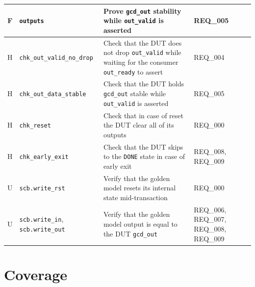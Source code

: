 \begin{table}[H]
\begin{tabularx}{\textwidth}{|c|p{3.9cm}|X|p{1.7cm}|}
        F               & \texttt{outputs}                                                                  & Prove \texttt{gcd\_out} stability while \texttt{out\_valid} is asserted                                                   & REQ\_005                                  \\ \bottomrule \toprule
        H               & \texttt{chk\_out\_valid\_no\_drop}                                                & Check that the DUT does not drop \texttt{out\_valid} while waiting for the consumer \texttt{out\_ready} to assert         & REQ\_004                                  \\ \midrule
        H               & \texttt{chk\_out\_data\_stable}                                                   & Check that the DUT holds \texttt{gcd\_out} stable while \texttt{out\_valid} is asserted                                   & REQ\_005                                  \\ \midrule
        H               & \texttt{chk\_reset}                                                               & Check that in case of reset the DUT clear all of its outputs                                                              & REQ\_000                                  \\ \midrule
        H               & \texttt{chk\_early\_exit}                                                         & Check that the DUT skips to the \texttt{DONE} state in case of early exit                                                 & REQ\_008, REQ\_009                        \\ \bottomrule \toprule
        U               & \texttt{scb.write\_rst}                                                           & Verify that the golden model resets its internal state mid-transaction                                                    & REQ\_000                                  \\ \midrule
        U               & \texttt{scb.write\_in}, \texttt{scb.write\_out}                                   & Verify that the golden model output is equal to the DUT \texttt{gcd\_out}                                                 & REQ\_006, REQ\_007, REQ\_008, REQ\_009    \\ \bottomrule
    \end{tabularx}
\end{table}
        

\section{Coverage}

